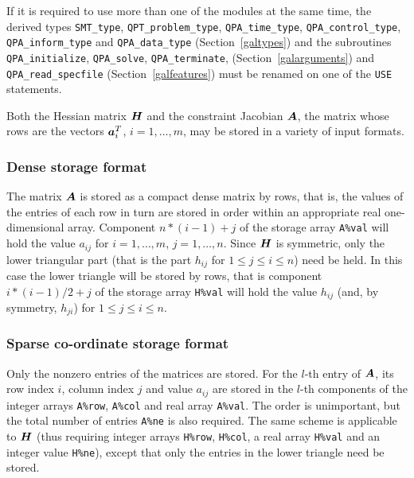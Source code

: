 \documentclass{galahad}
\newcommand{\packagename}{QPA}
\begin{document}

\galhowto



\noindent
If it is required to use more than one of the modules at the same time, 
the derived types
{\tt SMT\_type}, 
{\tt QPT\_problem\_type}, 
{\tt \packagename\_time\_type}, 
{\tt \packagename\_control\_type}, 
{\tt \packagename\_inform\_type} 
and
{\tt \packagename\_data\_type}
(Section~\ref{galtypes})
and the subroutines
{\tt \packagename\_initialize}, 
{\tt \packagename\_\-solve},
{\tt \packagename\_terminate},
(Section~\ref{galarguments})
and 
{\tt \packagename\_read\_specfile}
(Section~\ref{galfeatures})
must be renamed on one of the {\tt USE} statements.


\galmatrix
Both the Hessian matrix ${\bm{H}}$ and
the constraint Jacobian ${\bm{A}}$, the matrix 
whose rows are the vectors ${\bm{a}}_{i}^{T}$, $i = 1, \ldots , m$, 
may be stored in a variety of input formats.

\subsubsection{Dense storage format}\label{dense}
The matrix ${\bm{A}}$ is stored as a compact 
dense matrix by rows, that is, the values of the entries of each row in turn are
stored in order within an appropriate real one-dimensional array.
Component $n \ast (i-1) + j$ of the storage array {\tt A\%val} will hold the 
value $a_{ij}$ for $i = 1, \ldots , m$, $j = 1, \ldots , n$.
Since ${\bm{H}}$ is symmetric, only the lower triangular part (that is the part 
$h_{ij}$ for $1 \leq j \leq i \leq n$) need be held. In this case
the lower triangle will be stored by rows, that is 
component $i \ast (i-1)/2 + j$ of the storage array {\tt H\%val}  
will hold the value $h_{ij}$ (and, by symmetry, $h_{ji}$)
for $1 \leq j \leq i \leq n$.

\subsubsection{Sparse co-ordinate storage format}\label{coordinate}
Only the nonzero entries of the matrices are stored. For the 
$l$-th entry of ${\bm{A}}$, its row index $i$, column index $j$ 
and value $a_{ij}$
are stored in the $l$-th components of the integer arrays {\tt A\%row}, 
{\tt A\%col} and real array {\tt A\%val}. 
The order is unimportant, but the total
number of entries {\tt A\%ne} is also required. 
The same scheme is applicable to
${\bm{H}}$ (thus requiring integer arrays {\tt H\%row}, {\tt H\%col}, a real array 
{\tt H\%val} and an integer value {\tt H\%ne}),
except that only the entries in the lower triangle need be stored.
\end{document}
